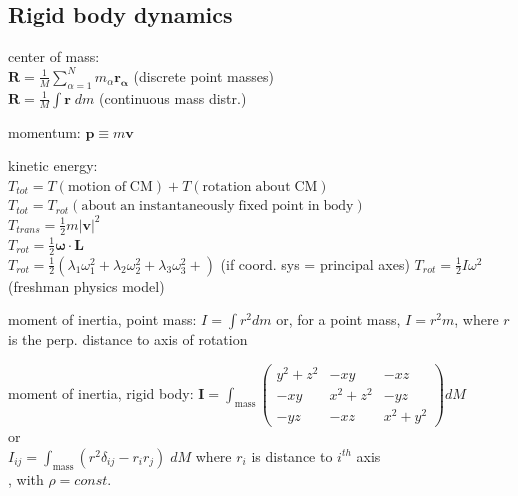 \documentclass[letterpaper,landscape,10pt]{article}
\newenvironment{mydescription}
{\begin{description}
	\setlength{\itemsep}{0pt}
	\setlength{\parskip}{0pt}
	\setlength{\parsep}{-1pt}}
{\end{description}}
\begin{document}
{\begin{multicols}{4}
	\subsection*{Rigid body dynamics}
		\begin{mydescription}
		  	\item[center of mass:] \ \\
			  $\bm{R} = \frac{1}{M}\sum_{\alpha=1}^Nm_\alpha\bm{r_\alpha}$ \hspace{5pt}(discrete point masses)\\
			  $\bm{R} = \frac{1}{M}\int\bm{r}\; dm$ \hspace{5pt}(continuous mass distr.)
			\item[momentum:] $\bm{p}\equiv m\bm{v}$
			\item[kinetic energy:] \ \\
			  $T_{tot} = T\mathrm{(motion\;of\;CM)}+T\mathrm{(rotation\;about\;CM)}$ \\
			  $T_{tot} = T_{rot}\mathrm{(about\;an\;instantaneously\;fixed\;point\;in\;body)}$ \\
	    	  $T_{trans} = \frac{1}{2}m|\bm{v}|^2$  \\
			  $T_{rot} = \frac{1}{2}\bm{\omega}\cdot\bm{L}$ \\
			  $T_{rot} = \frac{1}{2}\left( \lambda_1\omega_1^2 +
			  \lambda_2\omega_2^2 +  \lambda_3\omega_3^2 + \right)$ (if coord.
			  sys = principal axes)
			  $T_{rot} = \frac{1}{2}I\omega^2$ (freshman physics model)
			\item[moment of inertia, point mass:]
				$I = \int r^2dm$ or, for a point mass, $I = r^2m$, where $r$ is
				the perp. distance to axis of rotation  \\
			\item[moment of inertia, rigid body:]
			  $\bm{I}  = \int_{\mathrm{mass}} \begin{pmatrix} y^2+z^2 & -xy & -xz \\ -xy &
				x^2+z^2 & -yz \\ -yz & -xz & x^2+y^2 \end{pmatrix} dM $ \\
				or \\
				$I_{ij} = \int_{\mathrm{mass}} \left( r^2\delta_{ij}-r_i r_j \right)\;dM$\hspace{5pt} where $r_i$ is distance to $i^{th}$ axis \\
				, with $\rho=const.$ \\

\end{mydescription}
\end{multicols}}
\end{document}
